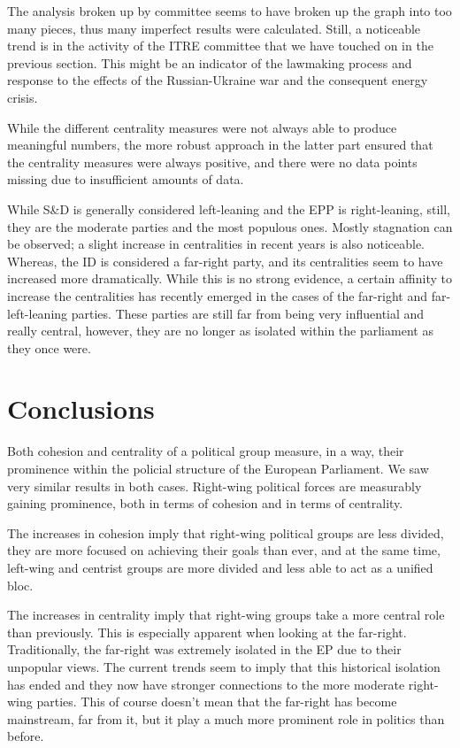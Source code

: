 \documentclass[lettersize,journal]{IEEEtran}
\begin{document}
The analysis broken up by committee seems to have broken up the graph into too many pieces, thus many imperfect results were calculated. Still, a noticeable trend is in the activity of the ITRE committee that we have touched on in the previous section. This might be an indicator of the lawmaking process and response to the effects of the Russian-Ukraine war and the consequent energy crisis. 

While the different centrality measures were not always able to produce meaningful numbers, the more robust approach in the latter part ensured that the centrality measures were always positive, and there were no data points missing due to insufficient amounts of data. %

While S\&D is generally considered left-leaning and the EPP is right-leaning, still, they are the moderate parties and the most populous ones. Mostly stagnation can be observed; a slight increase in centralities in recent years is also noticeable. Whereas, the ID is considered a far-right party, and its centralities seem to have increased more dramatically. While this is no strong evidence, a certain affinity to increase the centralities has recently emerged in the cases of the far-right and far-left-leaning parties. These parties are still far from being very influential and really central, however, they are no longer as isolated within the parliament as they once were.

\section{Conclusions} \label{sec:conclusions}

Both cohesion and centrality of a political group measure, in a way, their prominence within the policial structure of the European Parliament. We saw very similar results in both cases. Right-wing political forces are measurably gaining prominence, both in terms of cohesion and in terms of centrality.

The increases in cohesion imply that right-wing political groups are less divided, they are more focused on achieving their goals than ever, and at the same time, left-wing and centrist groups are more divided and less able to act as a unified bloc.

The increases in centrality imply that right-wing groups take a more central role than previously. This is especially apparent when looking at the far-right. Traditionally, the far-right was extremely isolated in the EP due to their unpopular views. The current trends seem to imply that this historical isolation has ended and they now have stronger connections to the more moderate right-wing parties. This of course doesn't mean that the far-right has become mainstream, far from it, but it play a much more prominent role in politics than before.
\end{document}
